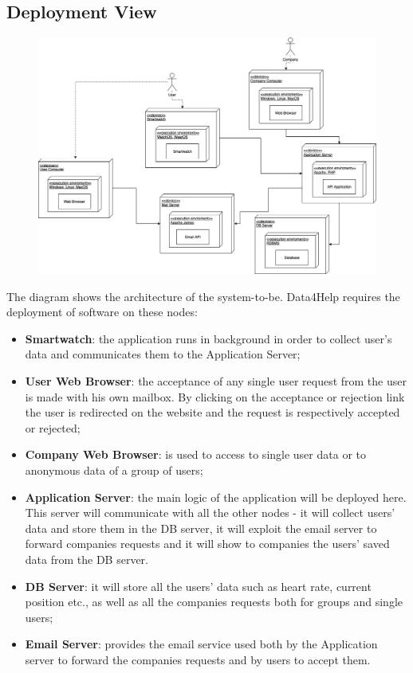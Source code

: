 \documentclass{article}
\begin{document}
\subsection{Deployment View}
\begin{figure}[h!]
\centering
    \textbf{}\par\medskip
	\includegraphics[width= \linewidth]{depl.png}
\end{figure}
The diagram shows the architecture of the system-to-be. Data4Help requires the deployment of software on these nodes:
\begin{itemize}
\item \textbf{Smartwatch}: the application runs in background in order to collect user's data and communicates them to the Application Server;
\item \textbf{User Web Browser}: the acceptance of any single user request from the user is made with his own mailbox. By clicking on the acceptance or rejection link the user is redirected on the website and the request is respectively accepted or rejected;
\item \textbf{Company Web Browser}: is used to access to single user data or to anonymous data of a group of users;
\item \textbf{Application Server}: the main logic of the application will be deployed here. This server will communicate with all the other nodes - it will collect users' data and store them in the DB server, it will exploit the email server to forward companies requests and it will show to companies the users' saved data from the DB server.
\item \textbf{DB Server}: it will store all the users' data such as heart rate, current position etc., as well as all the companies requests both for groups and single users;
\item \textbf{Email Server}: provides the email service used both by the Application server to forward the companies requests and by users to accept them.
\end{itemize}
\end{document}
